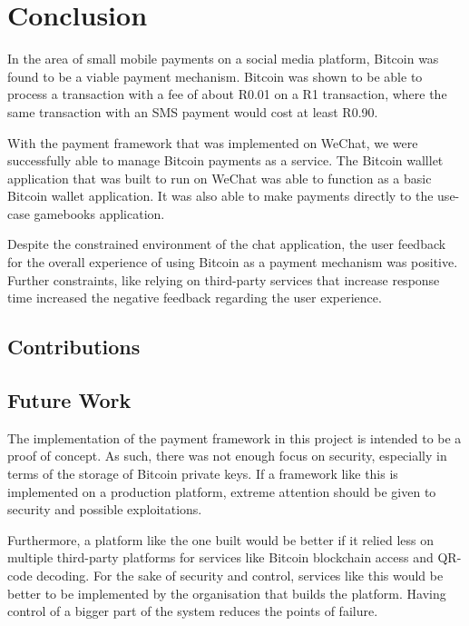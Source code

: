
\chapter{Conclusion}
\label{chp:Conclusion}


In the area of small mobile payments on a social media platform, Bitcoin was found to be a viable payment mechanism. Bitcoin was shown to be able to process a transaction with a fee of about R0.01 on a R1 transaction, where the same transaction with an SMS payment would cost at least R0.90. 

With the payment framework that was implemented on WeChat, we were successfully able to manage Bitcoin payments as a service. The Bitcoin walllet application that was built to run on WeChat was able to function as a basic Bitcoin wallet application. It was also able to make payments directly to the use-case gamebooks application.

Despite the constrained environment of the chat application, the user feedback for the overall experience of using Bitcoin as a payment mechanism was positive. Further constraints, like relying on third-party services that increase response time increased the negative feedback regarding the user experience. 

\section{Contributions}




\section{Future Work}

The implementation of the payment framework in this project is intended to be a proof of concept. As such, there was not enough focus on security, especially in terms of the storage of Bitcoin private keys. If a framework like this is implemented on a production platform, extreme attention should be given to security and possible exploitations.

Furthermore, a platform like the one built would be better if it relied less on multiple third-party platforms for services like Bitcoin blockchain access and QR-code decoding. For the sake of security and control, services like this would be better to be implemented by the organisation that builds the platform. Having control of a bigger part of the system reduces the points of failure.



